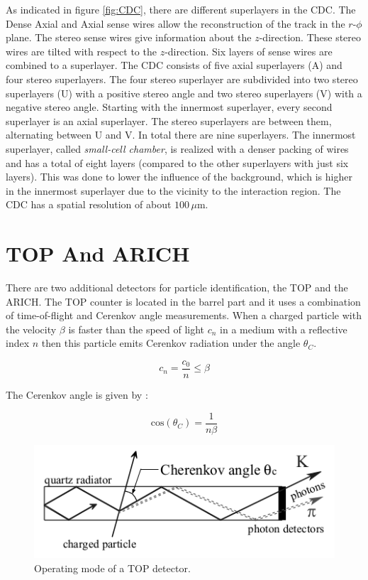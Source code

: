 \documentclass[a4paper,11pt,twosided,final,german,openbib,pdftex,listof=totoc,bibliography=totoc]{scrbook}
\begin{document}
As indicated in figure \ref{fig:CDC}, there are different superlayers in the CDC. The Dense Axial and Axial sense wires allow the reconstruction of the track in the $r$-$\phi$ plane. The stereo sense wires give information about the $z$-direction. These stereo wires are tilted with respect to the $z$-direction. Six layers of sense wires are combined to a superlayer. The CDC consists of five axial superlayers (A) and four stereo superlayers. The four stereo superlayer are subdivided into two stereo superlayers (U) with a positive stereo angle and two stereo superlayers (V) with a negative stereo angle. Starting with the innermost superlayer, every second superlayer is an axial superlayer. The stereo superlayers are between them, alternating between U and V. In total there are nine superlayers. The innermost superlayer, called \textit{small-cell chamber}, is realized with a denser packing of wires and has a total of eight layers (compared to the other superlayers with just six layers). This was done to lower the influence of the background, which is higher in the innermost superlayer due to the vicinity to the interaction region.
The CDC has a spatial resolution of about $100\,\mu\textrm{m}$.\cite{B2TR}

\section{TOP And ARICH}
\label{sec:ARTO}

There are two additional detectors for particle identification, the TOP and the ARICH. The TOP counter is located in the barrel part and it uses a combination of time-of-flight and Cerenkov angle measurements.
When a charged particle with the velocity $\beta$ is faster than the speed of light $c_n$ in a medium with a reflective index $n$ then this particle emits Cerenkov radiation under the angle $\theta_{C} $.\cite{cerenkovAngle}


\begin{equation}
c_n = \frac{c_0}{n} \leq \beta	
\end{equation}

The Cerenkov angle is given by \cite{cerenkovAngle}:

\begin{equation}
\textrm{cos}(\theta_C)=\frac{1}{n\beta}
\end{equation}

\begin{figure}[h!]
	\centering
	\includegraphics[width=12cm]{Bilder/TOP}
	\caption[TOP Principle]{Operating mode of a TOP detector.\cite{B2TR}}
	\label{fig:TOP}
\end{figure}
\end{document}
